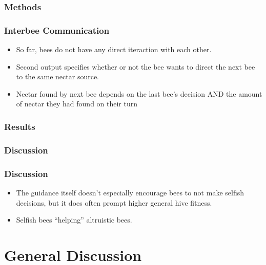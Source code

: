 \documentclass{beamer}
\begin{document}
      \subsubsection{Methods} %
      \label{ssub:methods}
        \begin{frame}[c]\frametitle{Interbee Communication}
         
          \begin{itemize}
            \item So far, bees do not have any direct iteraction with each 
                  other.
            \item Second output specifies whether or not the bee wants to
                  direct the next bee to the same nectar source.
            \item Nectar found by next bee depends on the last bee's decision
                  AND the amount of nectar they had found on their turn
          \end{itemize}
        \end{frame}  

      \subsubsection{Results} %
      \label{ssub:results}

      \subsubsection{Discussion} %
      \label{ssub:discussion}
        \begin{frame}[c]\frametitle{Discussion}
          \begin{itemize}
            \item The guidance itself doesn't especially encourage bees to not
                  make selfish decisions, but it does often prompt higher
                  general hive fitness.
            \item Selfish bees ``helping'' altruistic bees.
          \end{itemize}
        \end{frame}



  \section{General Discussion} %
  \label{sec:general_discussion}
  
\end{document}
